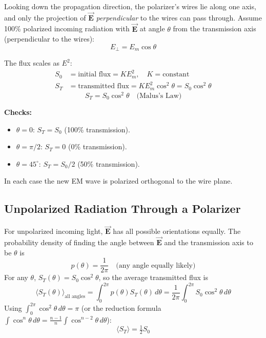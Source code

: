 \documentclass[11pt]{report}
\newcommand{\vbf}[1]{\vec{\mathbf{#1}}}
\begin{document}
Looking down the propagation direction, the polarizer's wires lie along one axis, and only the projection of $\vbf{E}$ \emph{perpendicular} to the wires can pass through. Assume 100\% polarized incoming radiation with $\vbf{E}$ at angle $\theta$ from the transmission axis (perpendicular to the wires):
\begin{equation}
E_\perp = E_m \cos\theta
\end{equation}

The flux scales as $E^2$:
\begin{align}
S_0 &= \text{initial flux} = K E_m^2, \quad K = \text{constant} \\
S_T &= \text{transmitted flux} = K E_m^2 \cos^2\theta = S_0 \cos^2\theta
\end{align}
\begin{equation}
\boxed{S_T = S_0 \cos^2\theta \quad \text{(Malus's Law)}}
\end{equation}

\textbf{Checks:}
\begin{itemize}
    \item $\theta = 0$: $S_T = S_0$ (100\% transmission). \checkmark
    \item $\theta = \pi/2$: $S_T = 0$ (0\% transmission). \checkmark
    \item $\theta = 45^\circ$: $S_T = S_0/2$ (50\% transmission).
\end{itemize}

In each case the new EM wave is polarized orthogonal to the wire plane.

\subsection*{Unpolarized Radiation Through a Polarizer}

For unpolarized incoming light, $\vbf{E}$ has all possible orientations equally. The probability density of finding the angle between $\vbf{E}$ and the transmission axis to be $\theta$ is
\begin{equation}
p(\theta) = \frac{1}{2\pi} \quad \text{(any angle equally likely)}
\end{equation}
For any $\theta$, $S_T(\theta) = S_0 \cos^2\theta$, so the average transmitted flux is
\begin{equation}
\langle S_T(\theta)\rangle_{\text{all angles}} = \int_0^{2\pi} p(\theta) S_T(\theta)\,d\theta = \frac{1}{2\pi}\int_0^{2\pi} S_0 \cos^2\theta\,d\theta
\end{equation}
Using $\int_0^{2\pi}\cos^2\theta\,d\theta = \pi$ (or the reduction formula $\int\cos^n\theta\,d\theta = \frac{n-1}{n}\int\cos^{n-2}\theta\,d\theta$):
\begin{equation}
\boxed{\langle S_T\rangle = \tfrac{1}{2}S_0}
\end{equation}
\end{document}
